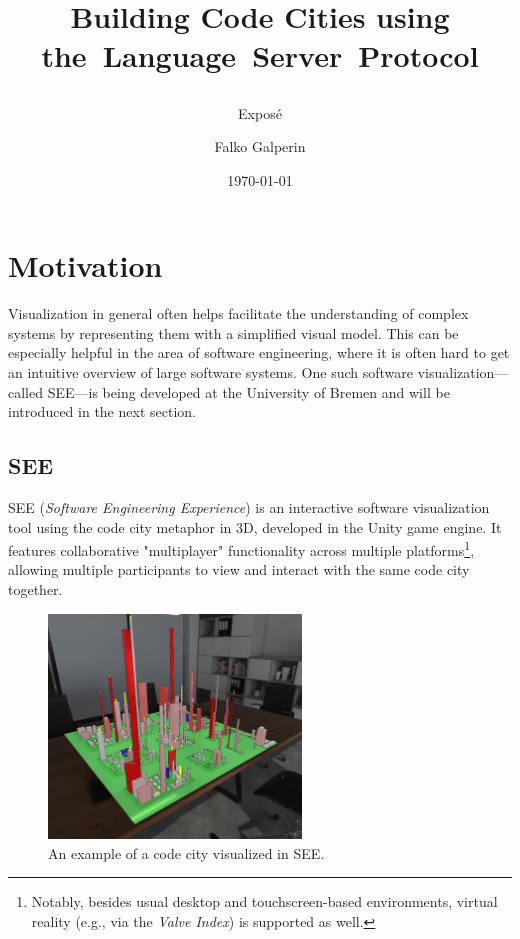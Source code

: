 \documentclass{scrartcl}
\newif\ifdraft
\newcommand{\SEE}{\textsc{SEE}}
\begin{document}
\title{
	Building Code Cities using \mbox{the Language Server Protocol}
	\ifdraft
		-- \emph{DRAFT} --
	\fi
}
\subtitle{Exposé}
\author{Falko Galperin}
\date{\today}

\maketitle

\begingroup
\tableofcontents
\endgroup
\newpage

\section{Motivation}
Visualization in general often helps facilitate the understanding of complex systems by representing them with a simplified visual model.
This can be especially helpful in the area of software engineering, where it is often hard to get an intuitive overview of large software systems.
One such software visualization---called \SEE{}---is being developed at the University of Bremen and will be introduced in the next section.


\subsection{SEE}
\SEE{} (\emph{Software Engineering Experience}) is an interactive software visualization tool using the code city metaphor in 3D, developed in the {Unity} game engine.
It features collaborative "multiplayer" functionality across multiple platforms\footnote{
	Notably, besides usual desktop and touchscreen-based environments, virtual reality (e.g., via the \emph{Valve Index}) is supported as well.
}, allowing multiple participants to view and interact with the same code city together.

\begin{figure}
	\centering
	\includegraphics[width=0.6\textwidth]{../figures/SEE_city}
	\caption{An example of a code city visualized in \SEE{}.}\label{fig:city}
\end{figure}
\end{document}
